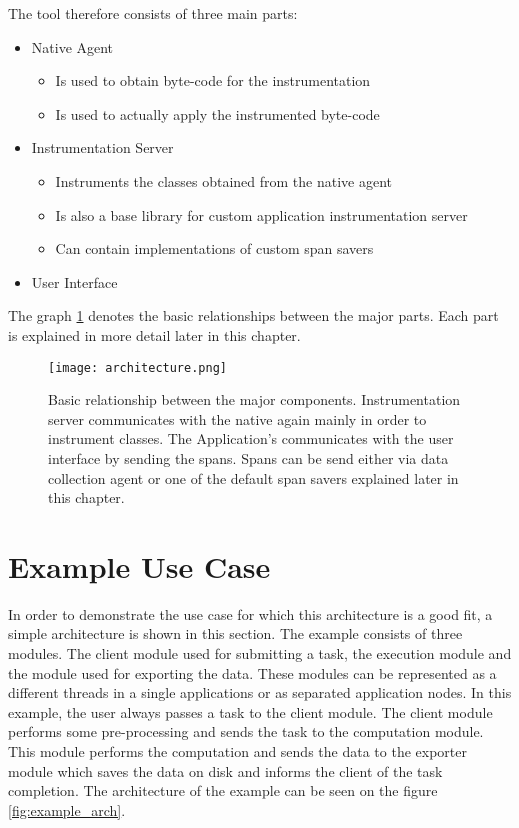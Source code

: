 The tool therefore consists of three main parts:
\begin{itemize}
	\item Native Agent
	\begin{itemize}
		\item Is used to obtain byte-code for the instrumentation
		\item Is used to actually apply the instrumented byte-code
	\end{itemize}
	\item Instrumentation Server
	\begin{itemize}
		\item Instruments the classes obtained from the native agent
		\item Is also a base library for custom application instrumentation server
		\item Can contain implementations of custom span savers
	\end{itemize}
	\item User Interface
\end{itemize}


The graph \ref{fig:architecture} denotes the basic relationships between the major parts. Each part is explained in more detail later in this chapter. \begin{figure}
	\centering
	\texttt{[image: architecture.png]}
	\caption{Basic relationship between the major components. Instrumentation server communicates with the native again mainly in order to instrument classes. The Application's communicates with the user interface by sending the spans. Spans can be send either via data collection agent or one of the default span savers explained later in this chapter.}
	\label{fig:architecture}
\end{figure}

\section{Example Use Case}
\label{design:use_case}
In order to demonstrate the use case for which this architecture is a good fit, a simple architecture is shown in this section. The example consists of three modules. The client module used for submitting a task, the execution module and the module used for exporting the data. These modules can be represented as a different threads in a single applications or as separated application nodes. In this example, the user always passes a task to the client module. The client module performs some pre-processing and sends the task to the computation module. This module performs the computation and sends the data to the exporter module which saves the data on disk and informs the client of the task completion. The architecture of the example can be seen on the figure \ref{fig:example_arch}.

